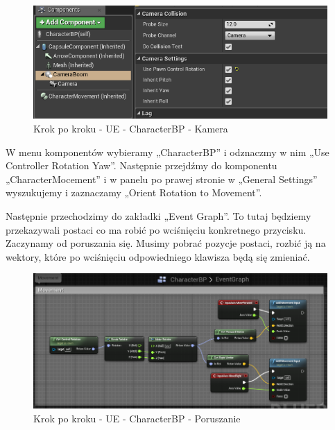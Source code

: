 \documentclass[12pt]{xmgr}
\begin{document}
\begin{figure}[!htb]
    \begin{center}
    \includegraphics[scale=0.35]{Screeny/UeKrokPoKroku/UE-CharacterBP-Camera.png}
    \end{center}
    \caption{Krok po kroku - UE -  CharacterBP - Kamera}
\end{figure}

\newpage
W menu komponentów wybieramy „CharacterBP” i odznaczmy w nim „Use Controller Rotation Yaw”. Następnie przejdźmy do komponentu „CharacterMocement” i w panelu po prawej stronie w „General Settings” wyszukujemy i zaznaczamy „Orient Rotation to Movement”.

Następnie przechodzimy do zakładki „Event Graph”. To tutaj będziemy przekazywali postaci co ma robić po wciśnięciu konkretnego przycisku. Zaczynamy od poruszania się. Musimy pobrać pozycje postaci, rozbić ją na wektory, które po wciśnięciu odpowiedniego klawisza będą się zmieniać.

\begin{figure}[!htb]
    \begin{center}
    \includegraphics[scale=0.35]{Screeny/UeKrokPoKroku/UE-CharacterBP-Movement.png}
    \end{center}
    \caption{Krok po kroku - UE -  CharacterBP - Poruszanie}
\end{figure}
\end{document}
